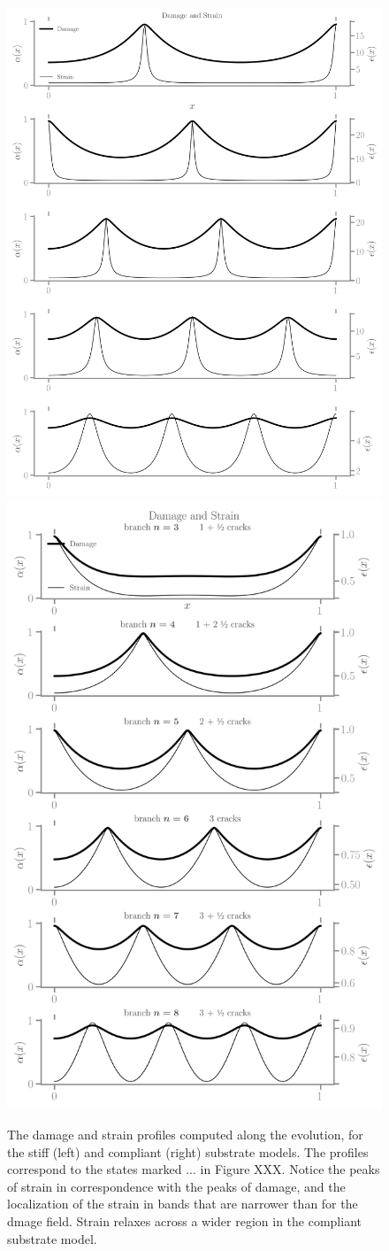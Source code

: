 \begin{figure}[htbp]
    \centering
    \includegraphics*[width=.45\textwidth]{../images/model_stiff_fields.png}
    \includegraphics*[width=.45\textwidth]{../images/model_compliant_fields.png}
    \caption{The damage and strain profiles computed along the evolution, for the stiff (left) and compliant (right) substrate models. The profiles correspond to the states marked $...$ in Figure XXX. Notice the peaks of strain in correspondence with the peaks of damage, and the localization of the strain in bands that are narrower than for the dmage field. Strain relaxes across a wider region in the compliant substrate model.}
    \label{fig:}
\end{figure}